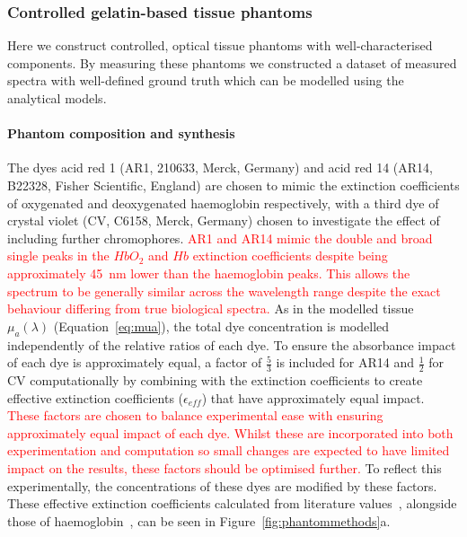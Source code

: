 \subsubsection{Controlled gelatin-based tissue phantoms}\label{sec:methodsphantoms}
Here we construct controlled, optical tissue phantoms with well-characterised components. By measuring these phantoms we constructed a dataset of measured spectra with well-defined ground truth which can be modelled using the analytical models.

\paragraph{Phantom composition and synthesis}\label{sec:methodsphantomcomposition}

The dyes acid red 1 (AR1, 210633, Merck, Germany) and acid red 14 (AR14, B22328, Fisher Scientific, England) are chosen to mimic the extinction coefficients of oxygenated and deoxygenated haemoglobin respectively, with a third dye of crystal violet (CV, C6158, Merck, Germany) chosen to investigate the effect of including further chromophores. \textcolor{red}{AR1 and AR14 mimic the double and broad single peaks in the $HbO_2$ and $Hb$ extinction coefficients despite being approximately 45~nm lower than the haemoglobin peaks. This allows the spectrum to be generally similar across the wavelength range despite the exact behaviour differing from true biological spectra.} As in the modelled tissue $\mu_a(\lambda)$ (Equation~\eqref{eq:mua}), the total dye concentration is modelled independently of the relative ratios of each dye. To ensure the absorbance impact of each dye is approximately equal, a factor of $\frac{5}{3}$ is included for AR14 and $\frac{1}{2}$ for CV computationally by combining with the extinction coefficients to create effective extinction coefficients ($\epsilon_{eff}$) that have approximately equal impact. \textcolor{red}{These factors are chosen to balance experimental ease with ensuring approximately equal impact of each dye. Whilst these are incorporated into both experimentation and computation so small changes are expected to have limited impact on the results, these factors should be optimised further.} To reflect this experimentally, the concentrations of these dyes are modified by these factors. These effective extinction coefficients calculated from literature values~\citep{Taniguchi2018}, alongside those of haemoglobin~\citep{Prahl1998}, can be seen in Figure~\ref{fig:phantommethods}a. 

